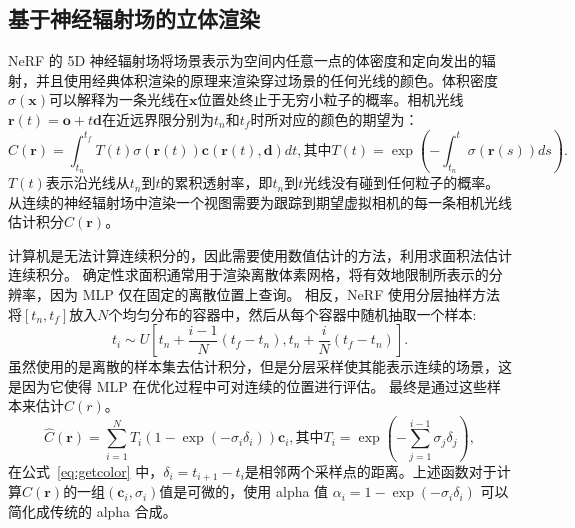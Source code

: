 \subsection{基于神经辐射场的立体渲染}
NeRF 的 5D 神经辐射场将场景表示为空间内任意一点的体密度和定向发出的辐射，并且使用经典体积渲染的原理来渲染穿过场景的任何光线的颜色。体积密度$\displaystyle \sigma \left(\symbf{x} \right)$可以解释为一条光线在$\displaystyle \symbf{x}$位置处终止于无穷小粒子的概率。相机光线$\displaystyle \symbf{r}\left(t \right) = \symbf{o} + t \symbf{d}$在近远界限分别为$\displaystyle t_n$和$\displaystyle t_f$时所对应的颜色的期望为：
\begin{equation}
    C \left(\symbf{r} \right) = \int_{t_n}^{t_f}T\left(t\right)\sigma\left(\symbf{r}\left(t\right)\right)\symbf{c}\left(\symbf{r}\left(t\right), \symbf{d}\right)dt, 
    \textit{其中}T\left(t\right) = \exp \left(-\int_{t_n}^{t}\sigma\left(\symbf{r}\left(s\right)\right)ds\right).
\end{equation}
$\displaystyle T\left(t\right)$表示沿光线从$t_n$到$t$的累积透射率，即$t_n$到$t$光线没有碰到任何粒子的概率。从连续的神经辐射场中渲染一个视图需要为跟踪到期望虚拟相机的每一条相机光线估计积分$\displaystyle C\left(\symbf{r}\right)$。

计算机是无法计算连续积分的，因此需要使用数值估计的方法，利用求面积法估计连续积分。 确定性求面积通常用于渲染离散体素网格，将有效地限制所表示的分辨率，因为 MLP 仅在固定的离散位置上查询。 相反，NeRF 使用分层抽样方法将$\displaystyle \left[t_n, t_f\right]$放入$N$个均匀分布的容器中，然后从每个容器中随机抽取一个样本:
\begin{equation}
    t_i \sim U \left[t_n + \frac{i - 1}{N}\left(t_f - t_n\right), t_n + \frac{i}{N}\left(t_f - t_n\right) \right].
    \label{eq:uniform}
\end{equation}
虽然使用的是离散的样本集去估计积分，但是分层采样使其能表示连续的场景，这是因为它使得 MLP 在优化过程中可对连续的位置进行评估。 最终是通过这些样本来估计$C(r)$。
\begin{equation}
    \hat{C}\left(\symbf{r}\right)=\sum_{i=1}^{N}T_i\left(1-\exp\left(-\sigma_i\delta_i\right)\right)\symbf{c}_i, \textit{其中}T_i=\exp\left(-\sum_{j=1}^{i-1}\sigma_j\delta_j \right),
    \label{eq:getcolor}
\end{equation}
在公式~\ref{eq:getcolor} 中，$\displaystyle \delta_i = t_{i + 1} - t_i$是相邻两个采样点的距离。上述函数对于计算$\displaystyle \hat{C}\left(\symbf{r}\right)$的一组$\displaystyle \left(\symbf{c}_i, \sigma_i\right)$值是可微的，使用 alpha 值 $\displaystyle \alpha_i = 1 - \exp \left(-\sigma_i\delta_i\right)$ 可以简化成传统的 alpha 合成。 

